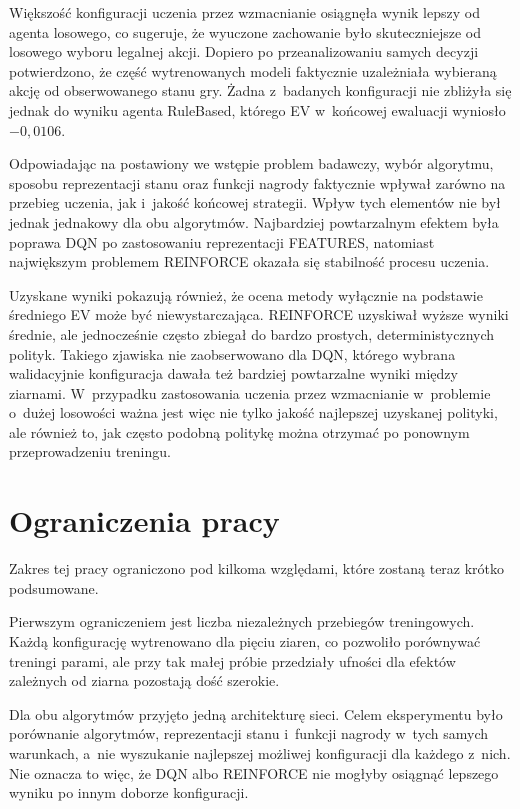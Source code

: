 Większość konfiguracji uczenia przez wzmacnianie osiągnęła wynik lepszy od
agenta losowego, co sugeruje, że wyuczone zachowanie było skuteczniejsze
od losowego wyboru legalnej akcji. Dopiero po przeanalizowaniu samych decyzji
potwierdzono, że
część wytrenowanych modeli faktycznie uzależniała wybieraną akcję od
obserwowanego stanu gry. Żadna z~badanych konfiguracji nie zbliżyła
się jednak do wyniku agenta RuleBased, którego EV w~końcowej ewaluacji
wyniosło $-0{,}0106$.

Odpowiadając na postawiony we wstępie problem badawczy, wybór
algorytmu, sposobu reprezentacji stanu oraz funkcji nagrody faktycznie
wpływał zarówno na przebieg uczenia, jak i~jakość końcowej strategii.
Wpływ tych elementów nie był jednak jednakowy dla obu algorytmów.
Najbardziej powtarzalnym efektem była poprawa DQN po zastosowaniu
reprezentacji FEATURES, natomiast największym problemem REINFORCE
okazała się stabilność procesu uczenia.

Uzyskane wyniki pokazują również, że ocena metody wyłącznie na
podstawie średniego EV może być niewystarczająca. REINFORCE uzyskiwał
wyższe wyniki średnie, ale jednocześnie często zbiegał do bardzo
prostych, deterministycznych polityk. Takiego zjawiska nie
zaobserwowano dla DQN, którego wybrana walidacyjnie konfiguracja
dawała też bardziej powtarzalne wyniki między ziarnami. W~przypadku
zastosowania uczenia przez wzmacnianie w~problemie o~dużej losowości
ważna jest więc nie tylko jakość najlepszej uzyskanej polityki, ale
również to, jak często podobną politykę można otrzymać po ponownym
przeprowadzeniu treningu.

\section*{Ograniczenia pracy}
\label{sec:ograniczenia-pracy}

Zakres tej pracy ograniczono pod kilkoma względami, które zostaną teraz krótko podsumowane.

Pierwszym ograniczeniem jest liczba niezależnych przebiegów
treningowych. Każdą konfigurację wytrenowano dla pięciu ziaren, co
pozwoliło porównywać treningi parami, ale przy tak małej próbie
przedziały ufności dla efektów zależnych od ziarna pozostają dość
szerokie.

Dla obu algorytmów przyjęto jedną architekturę sieci. Celem eksperymentu było porównanie
algorytmów, reprezentacji stanu i~funkcji nagrody w~tych samych
warunkach, a~nie wyszukanie najlepszej możliwej konfiguracji dla
każdego z~nich. Nie oznacza to więc, że DQN albo REINFORCE nie
mogłyby osiągnąć lepszego wyniku po innym doborze konfiguracji.

